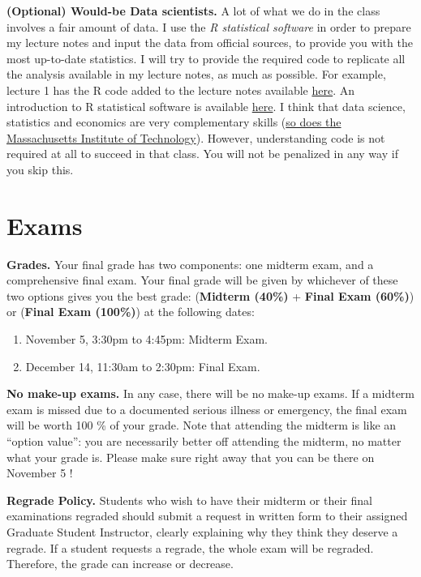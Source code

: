 \documentclass[]{book}
\providecommand{\tightlist}{%
  \setlength{\itemsep}{0pt}\setlength{\parskip}{0pt}}
\theoremstyle{definition}
\theoremstyle{definition}
\theoremstyle{definition}
\theoremstyle{remark}
\begin{document}
\textbf{(Optional) Would-be Data scientists.} A lot of what we do in the
class involves a fair amount of data. I use the \emph{R statistical
software} in order to prepare my lecture notes and input the data from
official sources, to provide you with the most up-to-date statistics. I
will try to provide the required code to replicate all the analysis
available in my lecture notes, as much as possible. For example, lecture
1 has the R code added to the lecture notes available
\href{https://fgeerolf.github.io/teaching/ECON102/lecture1-R.pdf}{here}.
An introduction to R statistical software is available
\href{https://fgeerolf.github.io/teaching/ECON102/R-intro.pdf}{here}. I
think that data science, statistics and economics are very complementary
skills
(\href{https://www.eecs.mit.edu/academics-admissions/undergraduate-programs/6-14-computer-science-economics-and-data-science}{so
does the Massachusetts Institute of Technology}). However, understanding
code is not required at all to succeed in that class. You will not be
penalized in any way if you skip this.

\section*{Exams}\label{exams}

\textbf{Grades.} Your final grade has two components: one midterm exam,
and a comprehensive final exam. Your final grade will be given by
whichever of these two options gives you the best grade:
(\textbf{Midterm (40\%)} + \textbf{Final Exam (60\%)}) or (\textbf{Final
Exam (100\%)}) at the following dates:

\begin{enumerate}
\def\labelenumi{\arabic{enumi}.}
\tightlist
\item
  November 5, 3:30pm to 4:45pm: Midterm Exam.
\item
  December 14, 11:30am to 2:30pm: Final Exam.
\end{enumerate}

\textbf{No make-up exams.} In any case, there will be no make-up exams.
If a midterm exam is missed due to a documented serious illness or
emergency, the final exam will be worth 100 \% of your grade. Note that
attending the midterm is like an ``option value'': you are necessarily
better off attending the midterm, no matter what your grade is. Please
make sure right away that you can be there on November 5 !

\textbf{Regrade Policy.} Students who wish to have their midterm or
their final examinations regraded should submit a request in written
form to their assigned Graduate Student Instructor, clearly explaining
why they think they deserve a regrade. If a student requests a regrade,
the whole exam will be regraded. Therefore, the grade can increase or
decrease.
\end{document}
